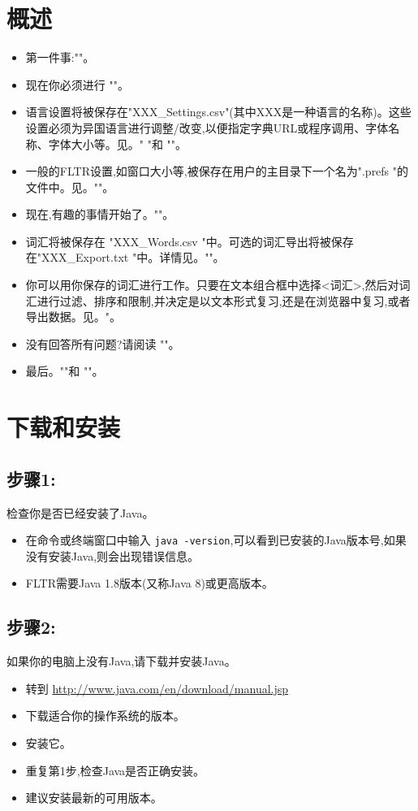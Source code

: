 \documentclass[cn,10pt,math=newtx,citestyle=gb7714-2015,bibstyle=gb7714-2015]{elegantbook}
\begin{document}
\chapter{ 概述}
\begin{itemize}
\item 第一件事:""。
\item 现在你必须进行 ""。
\item 语言设置将被保存在"XXX\_Settings.csv"(其中XXX是一种语言的名称)。这些设置必须为异国语言进行调整/改变,以便指定字典URL或程序调用、字体名称、字体大小等。见。" "和 ""。
\item 一般的FLTR设置,如窗口大小等,被保存在用户的主目录下一个名为".prefs "的文件中。见。""。
\item 现在,有趣的事情开始了。""。
\item 词汇将被保存在 "XXX\_Words.csv "中。可选的词汇导出将被保存在"XXX\_Export.txt "中。详情见。""。
\item 你可以用你保存的词汇进行工作。只要在文本组合框中选择<词汇>,然后对词汇进行过滤、排序和限制,并决定是以文本形式复习,还是在浏览器中复习,或者导出数据。见。"。
\item 没有回答所有问题?请阅读 ""。
\item 最后。""和 ""。

\end{itemize}

\chapter{下载和安装}\label{下载和安装}

\section*{步骤1:}
检查你是否已经安装了Java。
\begin{itemize}
    \item 在命令或终端窗口中输入 \lstinline{java -version},可以看到已安装的Java版本号,如果没有安装Java,则会出现错误信息。
    \item  FLTR需要Java 1.8版本(又称Java 8)或更高版本。
\end{itemize}

\section*{步骤2:}
如果你的电脑上没有Java,请下载并安装Java。
\begin{itemize}
    \item 转到 \url{http://www.java.com/en/download/manual.jsp}
    \item 下载适合你的操作系统的版本。
    \item 安装它。
    \item 重复第1步,检查Java是否正确安装。
    \item 建议安装最新的可用版本。
\end{itemize}
\end{document}
